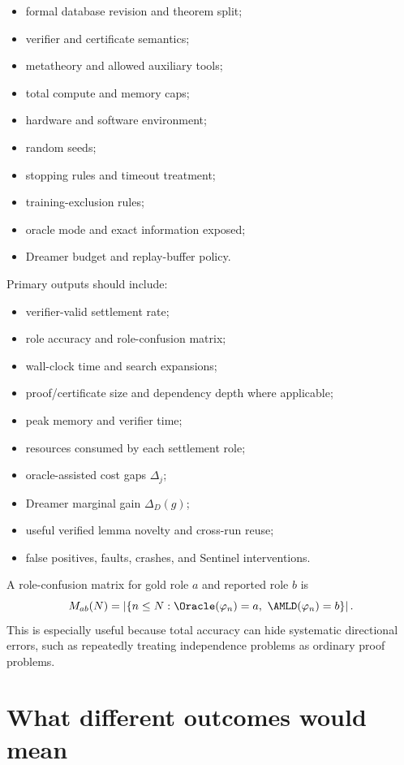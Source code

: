 \begin{itemize}
\item formal database revision and theorem split;
\item verifier and certificate semantics;
\item metatheory and allowed auxiliary tools;
\item total compute and memory caps;
\item hardware and software environment;
\item random seeds;
\item stopping rules and timeout treatment;
\item training-exclusion rules;
\item oracle mode and exact information exposed;
\item Dreamer budget and replay-buffer policy.
\end{itemize}

Primary outputs should include:
\begin{itemize}
\item verifier-valid settlement rate;
\item role accuracy and role-confusion matrix;
\item wall-clock time and search expansions;
\item proof/certificate size and dependency depth where applicable;
\item peak memory and verifier time;
\item resources consumed by each settlement role;
\item oracle-assisted cost gaps $\Delta_j$;
\item Dreamer marginal gain $\Delta_D(g)$;
\item useful verified lemma novelty and cross-run reuse;
\item false positives, faults, crashes, and Sentinel interventions.
\end{itemize}

A role-confusion matrix for gold role $a$ and reported role $b$ is
\begin{equation}
M_{ab}(N)=
\left|\{n\le N:\Oracle(\varphi_n)=a,\ \AMLD(\varphi_n)=b\}\right|.
\end{equation}
This is especially useful because total accuracy can hide systematic directional errors, such as repeatedly treating independence problems as ordinary proof problems.

\section{What different outcomes would mean}


